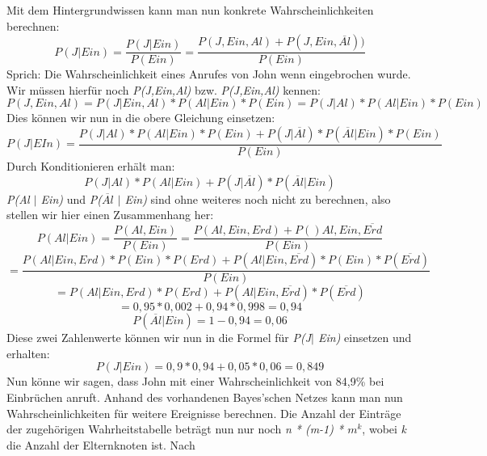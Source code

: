 Mit dem Hintergrundwissen kann man nun konkrete Wahrscheinlichkeiten berechnen:
\[ P(J\vert Ein) = \frac{P(J\vert Ein)}{P(Ein)}  = \frac{P(J,Ein,Al) + P(J,Ein, \overline{Al}))}{P(Ein)} \]
Sprich: Die Wahrscheinlichkeit eines Anrufes von John wenn eingebrochen wurde.
Wir müssen hierfür noch \textit{P(J,Ein,Al)} bzw. \textit{P(J,Ein,Al)} kennen:
\[ P(J, Ein, Al) = P(J\vert Ein, Al) * P(Al\vert Ein) * P(Ein) = P(J\vert Al) * P(Al\vert Ein) * P(Ein) \] 
Dies können wir nun in die obere Gleichung einsetzen:
\[ P(J\vert EIn) =  \frac{P(J\vert	Al) * P(Al\vert Ein) * P(Ein) + P(J\vert \overline{Al}) * P(\overline{Al} \vert Ein) * P(Ein) }{P(Ein)}  \]
Durch Konditionieren erhält man:
\[ P(J\vert Al) * P(Al\vert Ein) + P(J\vert \overline{Al}) * P(\overline{Al} \vert Ein) \]
\textit{P(Al $\vert$ Ein)} und \textit{P($\overline{Al}$ $\vert$ Ein)} sind ohne weiteres noch nicht zu berechnen, also stellen wir hier einen Zusammenhang her:
\[ P(Al\vert Ein) = \frac{P(Al, Ein)}{P(Ein)} = \frac{P(Al,Ein,Erd) + P()Al,Ein, \overline{Erd} }{P(Ein)}  \]
\[ = \frac{P(Al\vert Ein, Erd) * P(Ein) * P(Erd) + P(Al\vert Ein, \overline{Erd}) * P(Ein) * P(\overline{Erd}) }{P(Ein)}\]
\[ = P(Al\vert Ein, Erd) * P(Erd) + P(Al\vert Ein, \overline{Erd}) * P(\overline{Erd}) \]
\[ = 0,95 * 0,002 + 0,94 * 0,998 = 0,94 \]
\[ P(\overline{Al}\vert Ein) = 1-0,94 = 0,06 \]
Diese zwei Zahlenwerte können wir nun in die Formel für \textit{P(J$\vert$ Ein)} einsetzen und erhalten:
\[ P(J\vert Ein) = 0,9 * 0,94 + 0,05 * 0,06 = 0,849 \]
Nun könne wir sagen, dass John mit einer Wahrscheinlichkeit von 84,9\% bei Einbrüchen anruft. Anhand des vorhandenen Bayes'schen Netzes kann man nun Wahrscheinlichkeiten für weitere Ereignisse berechnen. 
Die Anzahl der Einträge der zugehörigen Wahrheitstabelle beträgt nun nur noch \textit{n * (m-1) * $m^k$}, wobei \textit{k} die Anzahl der Elternknoten ist. Nach \cite{Ertel16}

